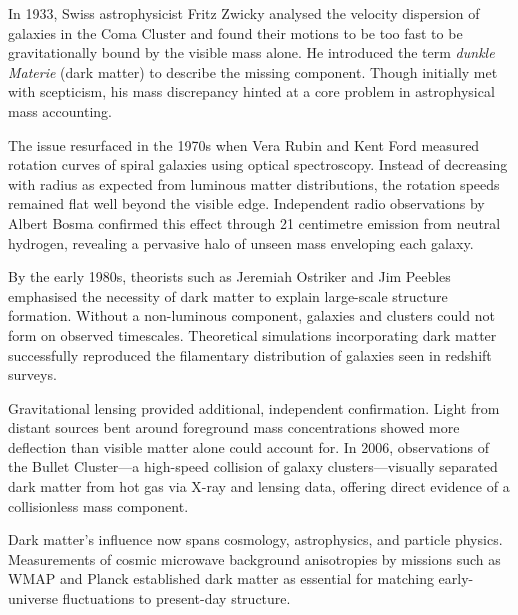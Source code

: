 \begin{historical}
In 1933, Swiss astrophysicist Fritz Zwicky analysed the velocity dispersion of galaxies in the Coma Cluster and found their motions to be too fast to be gravitationally bound by the visible mass alone. He introduced the term \textit{dunkle Materie} (dark matter) to describe the missing component. Though initially met with scepticism, his mass discrepancy hinted at a core problem in astrophysical mass accounting.

The issue resurfaced in the 1970s when Vera Rubin and Kent Ford measured rotation curves of spiral galaxies using optical spectroscopy. Instead of decreasing with radius as expected from luminous matter distributions, the rotation speeds remained flat well beyond the visible edge. Independent radio observations by Albert Bosma confirmed this effect through 21 centimetre emission from neutral hydrogen, revealing a pervasive halo of unseen mass enveloping each galaxy.

By the early 1980s, theorists such as Jeremiah Ostriker and Jim Peebles emphasised the necessity of dark matter to explain large-scale structure formation. Without a non-luminous component, galaxies and clusters could not form on observed timescales. Theoretical simulations incorporating dark matter successfully reproduced the filamentary distribution of galaxies seen in redshift surveys.

Gravitational lensing provided additional, independent confirmation. Light from distant sources bent around foreground mass concentrations showed more deflection than visible matter alone could account for. In 2006, observations of the Bullet Cluster—a high-speed collision of galaxy clusters—visually separated dark matter from hot gas via X-ray and lensing data, offering direct evidence of a collisionless mass component.

Dark matter’s influence now spans cosmology, astrophysics, and particle physics. Measurements of cosmic microwave background anisotropies by missions such as WMAP and Planck established dark matter as essential for matching early-universe fluctuations to present-day structure.
\end{historical}
